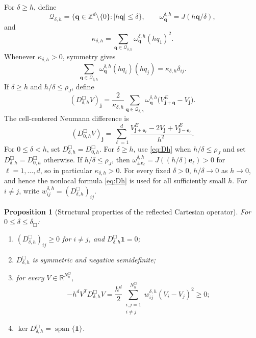 \documentclass[11pt]{article}
\newtheorem{proposition}[theorem]{Proposition}
\theoremstyle{definition}
\newcommand{\R}{\mathbb{R}}
\newcommand{\Z}{\mathbb{Z}}
\newcommand{\one}{\mathbf{1}}
\newcommand{\jj}{\bm j}
\newcommand{\qq}{\bm q}
\newcommand{\ee}{\bm e}
\begin{document}
For $\delta\ge h$, define
\[
 \mathcal Q_{\delta,h}
 =
 \{\qq\in\Z^d\setminus\{0\}:|h\qq|\le\delta\},
 \qquad
 \omega_{\qq}^{\delta,h}=J(h\qq/\delta),
\]
and
\begin{equation}
\label{eq:kappa}
 \kappa_{\delta,h}
 =
 \sum_{\qq\in\mathcal Q_{\delta,h}}
 \omega_{\qq}^{\delta,h}(hq_1)^2.
\end{equation}
Whenever $\kappa_{\delta,h}>0$, symmetry gives
\begin{equation}
\label{eq:disc-second-moment}
 \sum_{\qq\in\mathcal Q_{\delta,h}}
 \omega_{\qq}^{\delta,h}(hq_i)(hq_j)
 =
 \kappa_{\delta,h}\delta_{ij}.
\end{equation}
If $\delta\ge h$ and $h/\delta\le\rho_J$, define
\begin{equation}
\label{eq:Dh}
 (D_{\delta,h}^{\Box}V)_{\jj}
 =
 \frac{2}{\kappa_{\delta,h}}
 \sum_{\qq\in\mathcal Q_{\delta,h}}
 \omega_{\qq}^{\delta,h}
 \big(V^E_{\jj+\qq}-V_{\jj}\big).
\end{equation}
The cell-centered Neumann difference is
\begin{equation}
\label{eq:local-Dh}
 (D_{0,h}^{\Box}V)_{\jj}
 =
 \sum_{\ell=1}^{d}
 \frac{V^E_{\jj+\ee_{\ell}}-2V_{\jj}
       +V^E_{\jj-\ee_{\ell}}}{h^2}.
\end{equation}
For $0\le\delta<h$, set $D_{\delta,h}^{\Box}=D_{0,h}^{\Box}$.  For $\delta\ge h$, use \eqref{eq:Dh} when $h/\delta\le\rho_J$ and set $D_{\delta,h}^{\Box}=D_{0,h}^{\Box}$ otherwise.  If $h/\delta\le\rho_J$, then $\omega_{\pm\ee_\ell}^{\delta,h}=J((h/\delta)\ee_\ell)>0$ for $\ell=1,\ldots,d$, so in particular $\kappa_{\delta,h}>0$.  For every fixed $\delta>0$,
$h/\delta\to0$ as $h\to0$, and hence the nonlocal formula \eqref{eq:Dh}
is used for all sufficiently small $h$.  For $i\ne j$, write $w_{ij}^{\delta,h}=(D_{\delta,h}^{\Box})_{ij}$.

\begin{proposition}[Structural properties of the reflected Cartesian operator]
\label{prop:matrix-structure}
For $0\le\delta\le\delta_{\Box}$:
\begin{enumerate}[label=(\roman*)]
\item $(D_{\delta,h}^{\Box})_{ij}\ge0$ for $i\ne j$, and $D_{\delta,h}^{\Box}\one=0$;
\item $D_{\delta,h}^{\Box}$ is symmetric and negative semidefinite;
\item for every $V\in\R^{N_h^{\Box}}$,
\begin{equation}
\label{eq:energy}
 -h^dV^TD_{\delta,h}^{\Box}V
 =
 \frac{h^d}{2}
 \sum_{\substack{i,j=1\\ i\ne j}}^{N_h^{\Box}}
 w_{ij}^{\delta,h}(V_i-V_j)^2
 \ge0;
\end{equation}
\item $\ker D_{\delta,h}^{\Box}=\operatorname{span}\{\one\}$.
\end{enumerate}
\end{proposition}
\end{document}
